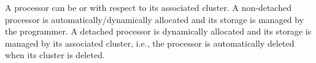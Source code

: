 \documentclass[openright,twoside]{report}
\begin{document}
%
%
%
%
%
A processor can be  or  with respect to its associated cluster.
A non-detached processor is automatically/dynamically allocated and its storage is managed by the programmer.
A detached processor is dynamically allocated and its storage is managed by its associated cluster, i.e., the processor is automatically deleted when its cluster is deleted.
\end{document}

